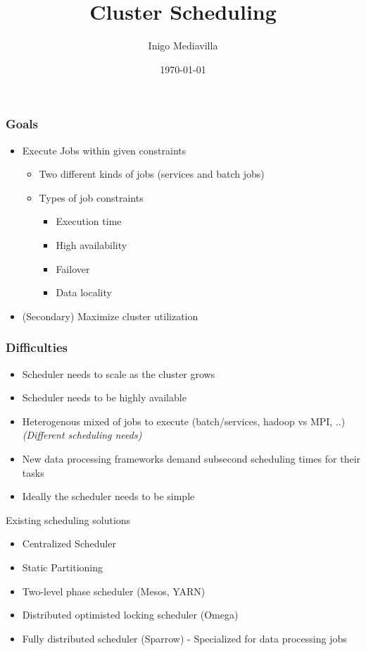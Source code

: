 \documentclass{beamer}
\title{Cluster Scheduling}
\author{Inigo Mediavilla}
\date\today
\begin{document}
  \begin{frame}
    \frametitle{Goals}
    \begin{itemize} 
     \item Execute Jobs within given constraints
       \begin{itemize}
         \item Two different kinds of jobs (services and batch jobs)
         \item Types of job constraints
         \begin{itemize}
           \item Execution time
           \item High availability
           \item Failover
           \item Data locality
         \end{itemize}
       \end{itemize}
     \item (Secondary) Maximize cluster utilization
    \end{itemize}
  \end{frame}
  \begin{frame}
    \frametitle{Difficulties}
    \begin{itemize}
      \item Scheduler needs to scale as the cluster grows
      \item Scheduler needs to be highly available
      \item Heterogenous mixed of jobs to execute 
            (batch/services, hadoop vs MPI, ..)
            \em (Different scheduling needs) 
      \item New data processing frameworks demand subsecond scheduling times for 
            their tasks
      \item Ideally the scheduler needs to be simple
    \end{itemize}
  \end{frame}
  \begin{frame}
    Existing scheduling solutions
    \begin{itemize}
      \item Centralized Scheduler
      \item Static Partitioning
      \item Two-level phase scheduler (Mesos, YARN)
      \item Distributed optimisted locking scheduler (Omega)
      \item Fully distributed scheduler (Sparrow) - Specialized for data processing
            jobs
    \end{itemize}
  \end{frame}
\end{document}
